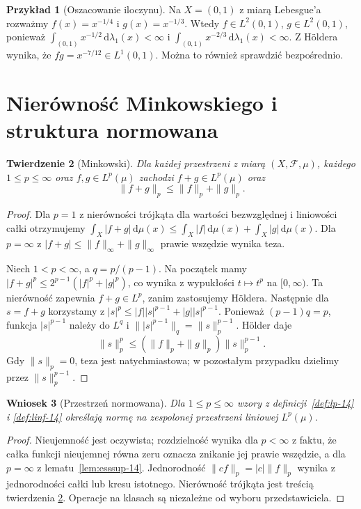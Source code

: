 \documentclass[11pt,a4paper,oneside]{book}
\numberwithin{equation}{chapter}
\theoremstyle{plain}
\newtheorem{twierdzenie}{Twierdzenie}[chapter]
\newtheorem{wniosek}[twierdzenie]{Wniosek}
\theoremstyle{definition}
\newtheorem{przyklad}[twierdzenie]{Przykład}
\theoremstyle{remark}
\begin{document}
\begin{przyklad}[Oszacowanie iloczynu]
Na $X=(0,1)$ z miarą Lebesgue'a rozważmy
$f(x)=x^{-1/4}$ i $g(x)=x^{-1/3}$.
Wtedy $f\in L^2(0,1)$, $g\in L^2(0,1)$,
ponieważ $\int_{(0,1)}x^{-1/2}\,\mathrm d\lambda_1(x)<\infty$
i $\int_{(0,1)}x^{-2/3}\,\mathrm d\lambda_1(x)<\infty$.
Z Höldera wynika, że $fg=x^{-7/12}\in L^1(0,1)$.
Można to również sprawdzić bezpośrednio.
\end{przyklad}

\section{Nierówność Minkowskiego i struktura normowana}
\begin{twierdzenie}[Minkowski]
\label{thm:minkowski-14}
Dla każdej przestrzeni z miarą $(X,\mathcal F,\mu)$,
każdego $1\le p\le\infty$ oraz $f,g\in L^p(\mu)$
zachodzi $f+g\in L^p(\mu)$ oraz
\begin{equation}\label{eq:minkowski-14}
\|f+g\|_p\le\|f\|_p+\|g\|_p.
\end{equation}
\end{twierdzenie}
\begin{proof}
Dla $p=1$ z nierówności trójkąta dla wartości
bezwzględnej i liniowości całki otrzymujemy
$\int_X|f+g|\,\mathrm d\mu(x)\le\int_X|f|\,\mathrm d\mu(x)+
\int_X|g|\,\mathrm d\mu(x)$.
Dla $p=\infty$ z
$|f+g|\le\|f\|_\infty+\|g\|_\infty$ prawie wszędzie
wynika teza.

Niech $1<p<\infty$, a $q=p/(p-1)$.
Na początek mamy
$|f+g|^p\le 2^{p-1}(|f|^p+|g|^p)$,
co wynika z wypukłości $t\mapsto t^p$ na $[0,\infty)$.
Ta nierówność zapewnia $f+g\in L^p$, zanim zastosujemy Höldera.
Następnie dla $s=f+g$ korzystamy z
$|s|^p\le |f||s|^{p-1}+|g||s|^{p-1}$.
Ponieważ $(p-1)q=p$, funkcja $|s|^{p-1}$ należy
do $L^q$ i $\||s|^{p-1}\|_q=\|s\|_p^{p-1}$.
Hölder daje
\[
\|s\|_p^p
\le(\|f\|_p+\|g\|_p)\|s\|_p^{p-1}.
\]
Gdy $\|s\|_p=0$, teza jest natychmiastowa;
w pozostałym przypadku dzielimy przez $\|s\|_p^{p-1}$.
\end{proof}

\begin{wniosek}[Przestrzeń normowana]
\label{cor:lp-normed-14}
Dla $1\le p\le\infty$ wzory z
definicji~\ref{def:lp-14} i \ref{def:linf-14}
określają normę na zespolonej przestrzeni liniowej $L^p(\mu)$.
\end{wniosek}
\begin{proof}
Nieujemność jest oczywista; rozdzielność wynika
dla $p<\infty$ z faktu, że całka funkcji nieujemnej
równa zeru oznacza znikanie jej prawie wszędzie,
a dla $p=\infty$ z lematu~\ref{lem:esssup-14}.
Jednorodność $\|cf\|_p=|c|\|f\|_p$ wynika
z jednorodności całki lub kresu istotnego.
Nierówność trójkąta jest treścią twierdzenia
\ref{thm:minkowski-14}. Operacje na klasach
są niezależne od wyboru przedstawiciela.
\end{proof}
\end{document}
